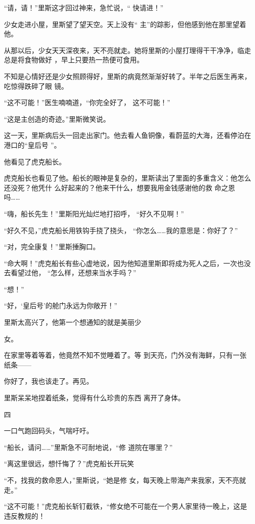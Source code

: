 \documentclass{article}
\begin{document}
“请，请！”里斯这才回过神来，急忙说，“
快请进！” 

少女走进小屋，里斯望了望天空。天上没有“
主”的踪影，但他感到他在那里望着他。 

\newpage

从那以后，少女天天深夜来，天不亮就走。她将里斯的小屋打理得干干净净，临走总是将食物做好
，早上只要热一热便可食用。 

不知是心情好还是少女照顾得好，里斯的病竟然渐渐好转了。半年之后医生再来，吃惊得跌碎了眼
镜。 

“这不可能！”医生喃喃道，“你完全好了，
这不可能！” 


“这是主创造的奇迹。”里斯微笑说。 

这一天，里斯病后头一回走出家门。他去看人鱼铜像，看蔚蓝的大海，还看停泊在港口的“皇后号
”。 


他看见了虎克船长。 

虎克船长也看见了他。船长的眼神是复杂的，里斯读出了里面的多重含义：他怎么还没死？他凭什
\newpage
么好起来的？他来干什么，想要我用金钱感谢他的救
命之恩吗…… 

“嗨，船长先生！”里斯阳光灿烂地打招呼，
“好久不见啊！” 

“好久不见，”虎克船长用铁钩手挠了挠头，
“你怎么……我的意思是：你好了？” 


“对，完全康复！”里斯捶胸口。 

“命大啊！”虎克船长有些心虚地说，因为他知道里斯即将成为死人之后，一次也没去看望过他，
“怎么样，还想来当水手吗？” 


“想！” 


“好，‘皇后号’的舱门永远为你敞开！” 

里斯太高兴了，他第一个想通知的就是美丽少

\newpage
女。 

在家里等着等着，他竟然不知不觉睡着了。等
到天亮，门外没有海鲜，只有一张纸条—— 


你好了，我也该走了。再见。 

里斯呆呆地捏着纸条，觉得有什么珍贵的东西
离开了身体。 


四 


一口气跑回码头，气喘吁吁。 

“船长，请问……”里斯急不可耐地说，“修
道院在哪里？” 

“离这里很远，想忏悔了？”虎克船长开玩笑

“不，找我的救命恩人，”里斯说，“她是修
女，每天晚上带海产来我家，天不亮就走。” 

\newpage

“这不可能！”虎克船长斩钉截铁，“修女绝不可能在一个男人家里待一晚上，这是违反教规的！
\end{document}
